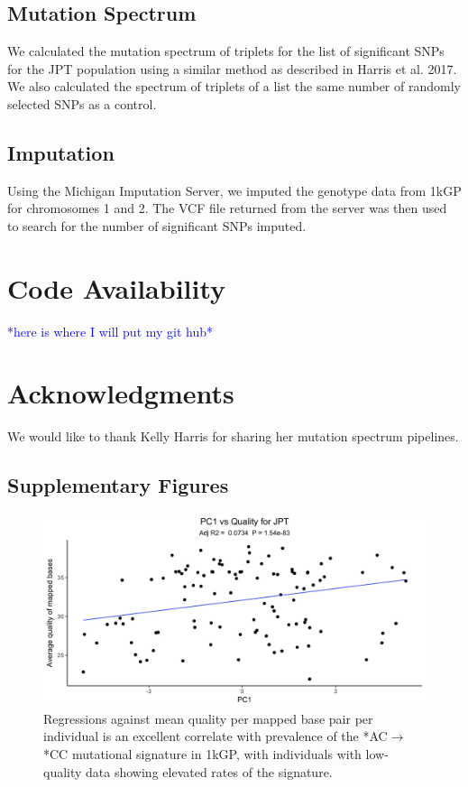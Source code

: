 \documentclass[9pt,lineno]{elife}
\newcommand{\todo}[1]{\textcolor{blue}{*#1*}}
\begin{document}
\subsection{Mutation Spectrum}
We calculated the mutation spectrum of triplets for the list of significant SNPs for the JPT population using a similar method as described in Harris et al. 2017. 
We also calculated the spectrum of triplets of a list the same number of randomly selected SNPs as a control.

\subsection{Imputation}
Using the Michigan Imputation Server, we imputed the genotype data from 1kGP for chromosomes 1 and 2. 
The VCF file returned from the server was then used to search for the number of significant SNPs imputed.

\section{Code Availability}
\todo{here is where I will put my git hub}

\section{Acknowledgments}
We would like to thank Kelly Harris for sharing her mutation spectrum pipelines.
 
\subsection{Supplementary Figures}
\begin{figure}
\includegraphics[width=\hsize,keepaspectratio]{PC1_Correlation.jpg}
\caption{Regressions against mean quality per mapped base pair per individual is an excellent correlate with prevalence of the  *AC${\rightarrow}$*CC mutational signature in 1kGP, with individuals with low-quality data showing elevated rates of the signature.  }
 \label{PC1_Correlation}
\end{figure}



\end{document}
